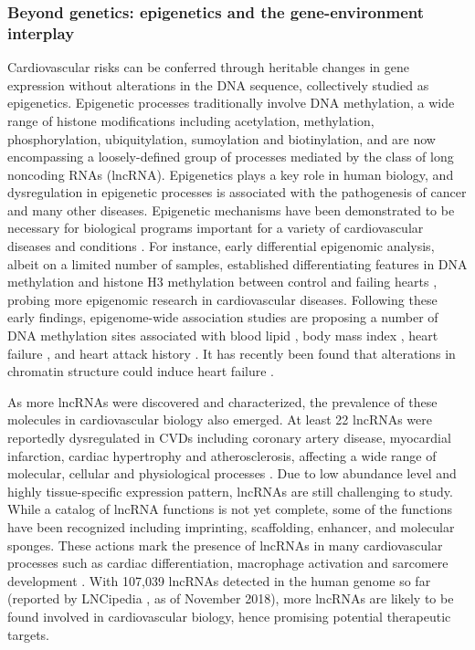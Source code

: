 \documentclass[letter]{bioinfo}
\begin{document}
\subsubsection*{Beyond genetics: epigenetics and the gene-environment interplay}	
	Cardiovascular risks can be conferred through heritable changes in gene expression without alterations in the DNA sequence, collectively studied as epigenetics. Epigenetic processes traditionally involve DNA methylation, a wide range of histone modifications including acetylation, methylation, phosphorylation, ubiquitylation, sumoylation and biotinylation, and are now encompassing a loosely-defined group of processes mediated by the class of long noncoding RNAs (lncRNA). Epigenetics plays a key role in human biology, and dysregulation in epigenetic processes is associated with the pathogenesis of cancer and many other diseases. Epigenetic mechanisms have been demonstrated to be necessary for biological programs important for a variety of cardiovascular diseases and conditions \citep{Udali:2013:Cardiovascular,AbiKhalil:2014:emerging,Muka:2016:role,Gidlof:2016:Ischemic}.
	For instance, early differential epigenomic analysis, albeit on a limited number of samples, established differentiating features in DNA methylation and histone H3 methylation between control and failing hearts \citep{Movassagh:2011:Distinct}, probing more epigenomic research in cardiovascular diseases. Following these early findings, epigenome-wide association studies are proposing a number of DNA methylation sites associated with blood lipid \citep{Irvin:2014:Epigenomewide}, body mass index \citep{Dick:2014:DNA, Wahl:2017:Epigenomewide}, heart failure \citep{Meder:2017:EpigenomeWide}, and heart attack history \citep{Rask-Andersen:2016:Epigenomewide}. It has recently been found that alterations in chromatin structure could induce heart failure \citep{Rosa-Garrido:2017:HighResolution}.
	
	As more lncRNAs were discovered and characterized, the prevalence of these molecules in cardiovascular biology also emerged.
	At least 22 lncRNAs were reportedly dysregulated in CVDs including coronary artery disease, myocardial infarction, cardiac hypertrophy and atherosclerosis, affecting a wide range of molecular, cellular and physiological processes \citep{Das:2018:Deciphering, Xu:2018:Targeting}. Due to low abundance level and highly tissue-specific expression pattern, lncRNAs are still challenging to study.
	While a catalog of lncRNA functions is not yet complete, some of the functions have been recognized including imprinting, scaffolding, enhancer, and molecular sponges. These actions mark the presence of lncRNAs in many cardiovascular processes such as cardiac differentiation, macrophage activation and sarcomere development \citep{Sallam:2018:Long}.
	With 107,039 lncRNAs detected in the human genome so far (reported by LNCipedia \citep{Volders:2018:LNCipedia}, as of November 2018), more lncRNAs are likely to be found involved in cardiovascular biology, hence promising potential therapeutic targets.
\end{document}
